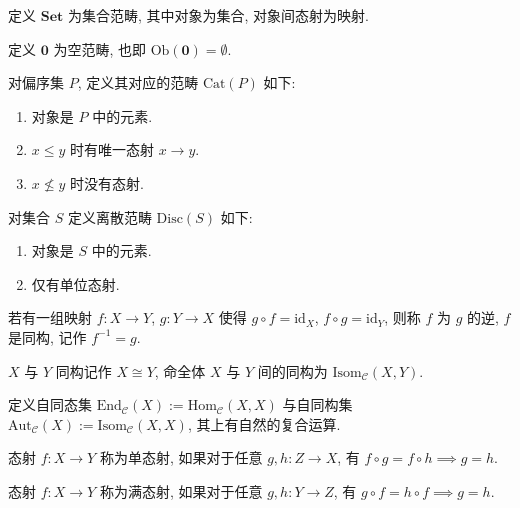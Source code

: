 \begin{example}
    定义 \(\mathbf{Set}\) 为集合范畴, 其中对象为集合, 对象间态射为映射.
\end{example}

\begin{example}
    定义 \(\mathbf{0}\) 为空范畴, 也即 \(\mathrm{Ob} (\mathbf{0}) = \emptyset\).
\end{example}

\begin{example}
    对偏序集 \(P\), 定义其对应的范畴 \(\mathrm{Cat} (P)\) 如下:

    \begin{enumerate}
        \item 对象是 \(P\) 中的元素.
        \item \(x \leq y\) 时有唯一态射 \(x \to y\).
        \item \(x \nleq y\) 时没有态射.
    \end{enumerate}
\end{example}

\begin{definition}
    对集合 \(S\) 定义离散范畴 \(\mathrm{Disc} (S)\) 如下:

    \begin{enumerate}
        \item 对象是 \(S\) 中的元素.
        \item 仅有单位态射.
    \end{enumerate}
\end{definition}

\begin{definition}
    若有一组映射 \(f : X \to Y\), \(g : Y \to X\) 使得 \(g \circ f = \mathrm{id}_X\), \(f \circ g = \mathrm{id}_Y\), 则称 \(f\) 为 \(g\) 的逆, \(f\) 是同构,
    记作 \(f^{-1} = g\).

    \(X\) 与 \(Y\) 同构记作 \(X \cong Y\), 命全体 \(X\) 与 \(Y\) 间的同构为 \(\mathrm{Isom}_{\mathcal{C}} (X,Y)\).
\end{definition}

\begin{definition}
    定义自同态集 \(\mathrm{End}_{\mathcal{C}} (X) := \mathrm{Hom}_{\mathcal{C}} (X,X)\) 与自同构集
    \(\mathrm{Aut}_{\mathcal{C}} (X) := \mathrm{Isom}_{\mathcal{C}} (X,X)\), 其上有自然的复合运算.
\end{definition}

\begin{definition}
    态射 \(f : X \to Y\) 称为单态射, 如果对于任意 \(g,h : Z \to X\), 有 \(f \circ g = f \circ h \implies g = h\).

    态射 \(f : X \to Y\) 称为满态射, 如果对于任意 \(g,h : Y \to Z\), 有 \(g \circ f = h \circ f \implies g = h\).
\end{definition}


